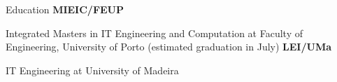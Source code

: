 
\begin{rubric}{Education}
		\textbf{MIEIC/FEUP}

		Integrated Masters in IT Engineering and Computation at Faculty of 
		Engineering, University of Porto (estimated graduation in July)
		\textbf{LEI/UMa}

		IT Engineering at University of Madeira
\end{rubric}
